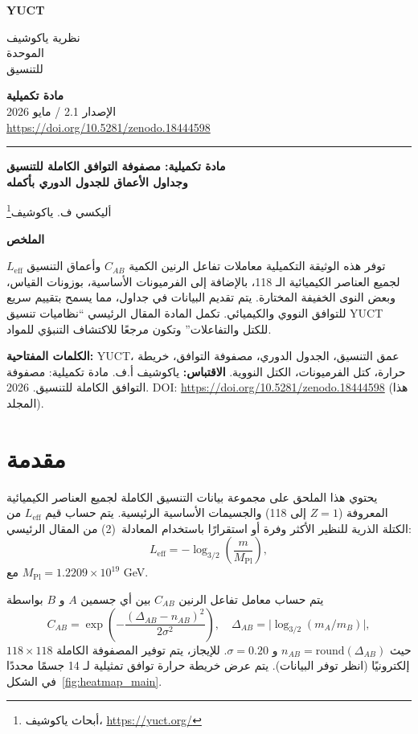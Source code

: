 \documentclass[12pt,a4paper]{article}
\newcommand{\makeheader}{%
	\noindent
	\begin{minipage}{0.17\textwidth}
		\raggedright
		{\sffamily\bfseries\color{skyblue}\fontsize{40}{40}\selectfont YUCT}%
	\end{minipage}%
	\hspace{30pt}
	\begin{minipage}{0.32\textwidth}
		\raggedright
		{\sffamily\fontsize{11}{13}\selectfont نظرية ياكوشيف\\ الموحدة\\ للتنسيق}%
	\end{minipage}%
	\hfill
	\begin{minipage}{0.38\textwidth}
		\raggedleft
		{\sffamily\bfseries مادة تكميلية}\\
		{\sffamily الإصدار 2.1 / مايو 2026}\\
		{\sffamily\footnotesize \url{https://doi.org/10.5281/zenodo.18444598}}%
	\end{minipage}
	\par\vspace{5pt}
	\noindent\textcolor{gold}{\rule{\textwidth}{1.6pt}}
	\par\vspace{0pt}
}
\begin{document}
	\thispagestyle{firstpage}
	\makeheader
	
	\vspace{0cm}
	{\LARGE\bfseries مادة تكميلية: مصفوفة التوافق الكاملة للتنسيق \\ 
		\Large وجداول الأعماق للجدول الدوري بأكمله \par}
	\vspace{0.2cm}
	
	{\large أليكسي ف. ياكوشيف\footnote{أبحاث ياكوشيف، \url{https://yuct.org/}}} \\
	\vspace{0.0cm}
	
	{\color{darkblue}\textbf{\LARGE الملخص}} \par
	{\large
		\noindent
		توفر هذه الوثيقة التكميلية معاملات تفاعل الرنين الكمية \(C_{AB}\) وأعماق التنسيق \(L_{\mathrm{eff}}\) لجميع العناصر الكيميائية الـ 118، بالإضافة إلى الفرميونات الأساسية، بوزونات القياس، وبعض النوى الخفيفة المختارة. يتم تقديم البيانات في جداول، مما يسمح بتقييم سريع للتوافق النووي والكيميائي. تكمل المادة المقال الرئيسي ``نظاميات تنسيق YUCT للكتل والتفاعلات'' وتكون مرجعًا للاكتشاف التنبؤي للمواد.
	}
	
	\vspace{0.1cm}
	\noindent
	{\color{darkblue}\textbf{الكلمات المفتاحية:}} YUCT، عمق التنسيق، الجدول الدوري، مصفوفة التوافق، خريطة حرارة، كتل الفرميونات، الكتل النووية.
	\vspace{0.1cm}
	\noindent
	{\color{darkblue}\textbf{الاقتباس:}} ياكوشيف أ.ف. مادة تكميلية: مصفوفة التوافق الكاملة للتنسيق. 2026. DOI: \url{https://doi.org/10.5281/zenodo.18444598} (هذا المجلد).
	
	\vspace{0.4cm}
	
	\noindent
	\begin{minipage}[t]{0.48\textwidth}
		\section*{مقدمة}
		يحتوي هذا الملحق على مجموعة بيانات التنسيق الكاملة لجميع العناصر الكيميائية المعروفة (\(Z = 1\) إلى 118) والجسيمات الأساسية الرئيسية. يتم حساب قيم \(L_{\mathrm{eff}}\) من الكتلة الذرية للنظير الأكثر وفرة أو استقرارًا باستخدام المعادلة~(2) من المقال الرئيسي:
		\[
		L_{\mathrm{eff}} = -\log_{3/2}\!\left( \frac{m}{M_{\mathrm{Pl}}} \right),
		\]
		مع \(M_{\mathrm{Pl}} = 1.2209\times 10^{19}\) GeV.
	\end{minipage}\hfill
	\begin{minipage}[t]{0.48\textwidth}
		يتم حساب معامل تفاعل الرنين \(C_{AB}\) بين أي جسمين \(A\) و \(B\) بواسطة
		\[
		C_{AB} = \exp\!\left( - \frac{(\Delta_{AB} - n_{AB})^2}{2\sigma^2} \right),\quad
		\Delta_{AB} = \bigl|\log_{3/2}(m_A/m_B)\bigr|,
		\]
		حيث \(n_{AB} = \text{round}(\Delta_{AB})\) و \(\sigma = 0.20\).
		للإيجاز، يتم توفير المصفوفة الكاملة \(118\times118\) إلكترونيًا (انظر توفر البيانات). يتم عرض خريطة حرارة توافق تمثيلية لـ 14 جسمًا محددًا في الشكل~\ref{fig:heatmap_main}.
	\end{minipage}
	
\end{document}
